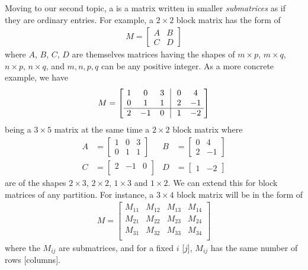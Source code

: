 Moving to our second topic, a  is a matrix written in smaller \textit{submatrices} as if they are ordinary entries. For example, a $2 \times 2$ block matrix has the form of
\begin{align*}
M =
\begin{bmatrix}
A & B \\
C & D
\end{bmatrix}
\end{align*}
where $A$, $B$, $C$, $D$ are themselves matrices having the shapes of $m \times p$, $m \times q$, $n \times p$, $n \times q$, and $m, n, p, q$ can be any positive integer. As a more concrete example, we have
\begin{align*}
M = 
\left[\begin{array}{@{\,}wc{10pt}wc{10pt}wc{10pt}|wc{10pt}wc{10pt}}
1 & 0 & 3 & 0 & 4 \\
0 & 1 & 1 & 2 & -1 \\
\hline
2 & -1 & 0 & 1 & -2 \\
\end{array}\right]
\end{align*}
being a $3 \times 5$ matrix at the same time a $2 \times 2$ block matrix where
\begin{align*}
A &= \begin{bmatrix}
1 & 0 & 3 \\
0 & 1 & 1
\end{bmatrix}
& 
B &= \begin{bmatrix}
0 & 4 \\
2 & -1
\end{bmatrix} \\
C &= \begin{bmatrix}
2 & -1 & 0 \\
\end{bmatrix}
& 
D &= \begin{bmatrix}
1 & -2
\end{bmatrix}
\end{align*}
are of the shapes $2 \times 3$, $2 \times 2$, $1 \times 3$ and $1 \times 2$. We can extend this for block matrices of any partition. For instance, a $3 \times 4$ block matrix will be in the form of
\begin{align*}
M =
\begin{bmatrix}
M_{11} & M_{12} & M_{13} & M_{14} \\
M_{21} & M_{22} & M_{23} & M_{24} \\
M_{31} & M_{32} & M_{33} & M_{34} \\
\end{bmatrix}
\end{align*}
where the $M_{ij}$ are submatrices, and for a fixed $i$ [$j$], $M_{ij}$ has the same number of rows [columns].

